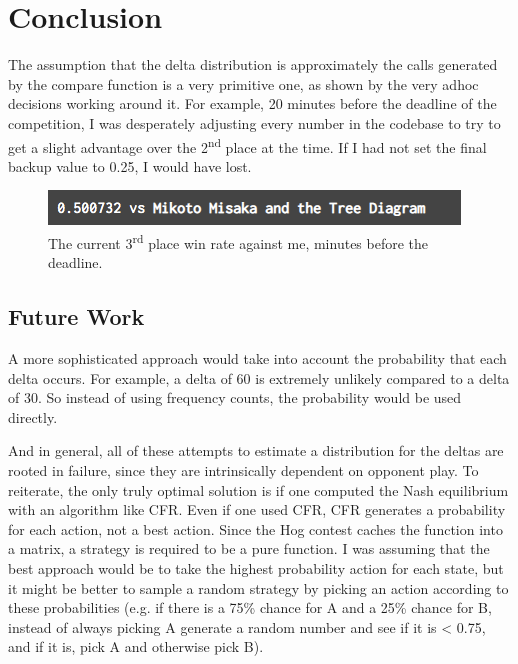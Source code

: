 \documentclass[11pt, oneside]{article}
\begin{document}
\newpage

\section{Conclusion}

The assumption that the delta distribution is approximately the calls
generated by the compare function is a very primitive one, as shown 
by the very adhoc decisions working around it.
For example, 20 minutes before the deadline of the competition,
I was desperately adjusting every number in the codebase to try to get a
slight advantage over the 2\textsuperscript{nd} place at the time. 
If I had not set the final backup value to 0.25, I would have lost.

\begin{figure}[h!]
  \centering
  \includegraphics[scale=0.75]{close}
  \caption{The current 3\textsuperscript{rd} place win rate against me, 
  minutes before the deadline.}
\end{figure}

\subsection{Future Work}

A more sophisticated approach would take into account the probability that 
each delta occurs. For example, a delta of 60 is extremely unlikely
compared to a delta of 30.
So instead of using frequency counts, the probability would be used directly.

And in general, all of these attempts to estimate a distribution for the
deltas are rooted in failure, since they are intrinsically dependent
on opponent play. To reiterate, the only truly optimal solution
is if one computed the Nash equilibrium with an algorithm like CFR.
Even if one used CFR, CFR generates a probability for each action,
not a best action. Since the Hog contest caches the function into a matrix,
a strategy is required to be a pure function.
I was assuming that the best approach would be to 
take the highest probability action for each state, but it might be better
to sample a random strategy by picking an action according to these
probabilities (e.g. if there is a 75\% chance for A and a 25\% chance for B,
instead of always picking A generate a random number and see if it is < 0.75,
and if it is, pick A and otherwise pick B).
\end{document}
